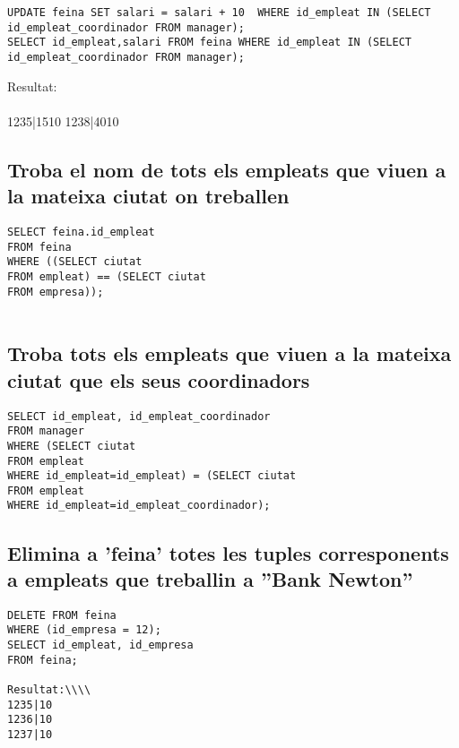 \documentclass[11p]{article}
\begin{document}
\begin{lstlisting}
UPDATE feina SET salari = salari + 10  WHERE id_empleat IN (SELECT id_empleat_coordinador FROM manager);
SELECT id_empleat,salari FROM feina WHERE id_empleat IN (SELECT id_empleat_coordinador FROM manager);
\end{lstlisting}

Resultat:\\\\

1235|1510
1238|4010

\subsection{Troba el nom de tots els empleats que viuen a la mateixa ciutat on treballen}

\begin{lstlisting}
SELECT feina.id_empleat
FROM feina
WHERE ((SELECT ciutat
FROM empleat) == (SELECT ciutat
FROM empresa));


\end{lstlisting}

\subsection{Troba tots els empleats que viuen a la mateixa ciutat que els seus coordinadors}

\begin{lstlisting}
SELECT id_empleat, id_empleat_coordinador
FROM manager
WHERE (SELECT ciutat
FROM empleat
WHERE id_empleat=id_empleat) = (SELECT ciutat
FROM empleat
WHERE id_empleat=id_empleat_coordinador);

\end{lstlisting}

\subsection{Elimina a ’feina’ totes les tuples corresponents a empleats que treballin a ”Bank Newton”}

\begin{lstlisting}
DELETE FROM feina 
WHERE (id_empresa = 12);
SELECT id_empleat, id_empresa
FROM feina;

Resultat:\\\\
1235|10
1236|10
1237|10

\end{lstlisting}
\end{document}
